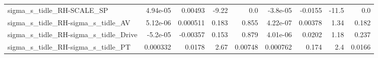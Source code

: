 \begin{tabular}{lrrrrrrrr}
sigma\_s\_tidle\_RH-SCALE\_SP                          &    4.94e-05 &      0.00493 &     -9.22 &      0.0 &   -3.8e-05 &     -0.0155 &        -11.5 &           0.0 \\
sigma\_s\_tidle\_RH-sigma\_s\_tidle\_AV                  &    5.12e-06 &     0.000511 &     0.183 &    0.855 &   4.22e-07 &     0.00378 &         1.34 &         0.182 \\
sigma\_s\_tidle\_RH-sigma\_s\_tidle\_Drive               &    -5.2e-05 &     -0.00357 &     0.153 &    0.879 &   4.01e-06 &      0.0202 &         1.18 &         0.237 \\
sigma\_s\_tidle\_RH-sigma\_s\_tidle\_PT                  &    0.000332 &       0.0178 &      2.67 &  0.00748 &   0.000762 &       0.174 &          2.4 &        0.0166 \\
\bottomrule
\end{tabular}
